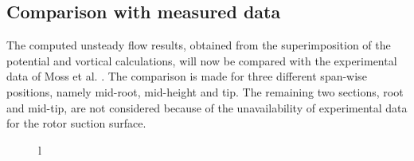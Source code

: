 \subsection{Comparison with measured data}
\label{rt27_comparison.subsec}
%
 The computed unsteady flow results, obtained from the superimposition of
 the potential and vortical calculations, will
 now be compared with the experimental data of Moss et al. \citeyear{Moss:1}.
 The comparison is made for three different span-wise positions, namely
 mid-root, mid-height and tip. The remaining two sections, root
 and mid-tip, are not considered because of the unavailability of
 experimental data for the rotor suction surface.
%
%
\begin{figure}
  \begin{flushleft}
   \begin{tabular}{l}
\end{tabular}
\end{flushleft}
\end{figure}
